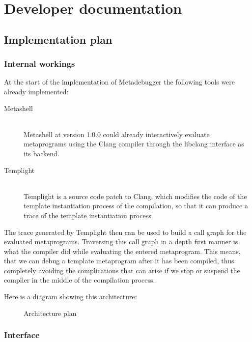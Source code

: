 
\chapter{Developer documentation} \label{devdoc}

\section{Implementation plan}

\subsection{Internal workings}

At the start of the implementation of Metadebugger the following tools were
already implemented:
\begin{description}
    \item[Metashell]\cite{github} \hfill \\
        Metashell at version 1.0.0 \cite{github-releases} could already
        interactively evaluate metaprograms using the Clang\cite{clang}
        compiler through the libclang\cite{libclang} interface as its backend.
    \item[Templight]\cite{templight} \hfill \\
        Templight is a source code patch to Clang, which modifies the code
        of the template instantiation process of the compilation, so that it can
        produce a trace of the template instantiation process.
\end{description}

The trace generated by Templight then can be used to build a call graph for the
evaluated metaprograms. Traversing this call graph in a depth first manner is
what the compiler did while evaluating the entered metaprogram. This means,
that we can debug a template metaprogram after it has been compiled, thus
completely avoiding the complications that can arise if we stop or suspend the
compiler in the middle of the compilation process.

Here is a diagram showing this architecture:

\begin{figure}[H]
    \centering
    
    \caption{Architecture plan}
\end{figure}

\subsection{Interface}

